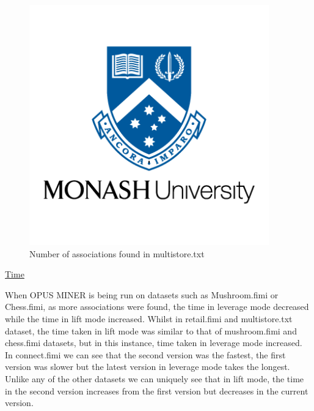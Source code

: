 \documentclass[10pt,a4paper]{article}
\begin{document}
\vspace{2cm}

\begin{figure}[h!]
\begin{center}
  \includegraphics[width=28em]{monash-university-logo.png}
\end{center}
  \caption{Number of associations found in multistore.txt}
  \label{fig:SSPresults1}
\end{figure}

\pagebreak

\underline{Time}
\vspace{0.3cm}
\begin{addmargin}[3em]{1em}
When OPUS MINER is being run on datasets such as Mushroom.fimi or Chess.fimi, as more associations were found, the time in leverage mode decreased while the time in lift mode increased. Whilst in retail.fimi and multistore.txt dataset, the time taken in lift mode was similar to that of mushroom.fimi and chess.fimi datasets, but in this instance, time taken in leverage mode increased. In connect.fimi we can see that the second version was the fastest, the first version was slower but the latest version in leverage mode takes the longest. Unlike any of the other datasets we can uniquely see that in lift mode, the time in the second version increases from the first version but decreases in the current version.
\end{addmargin}
\end{document}
